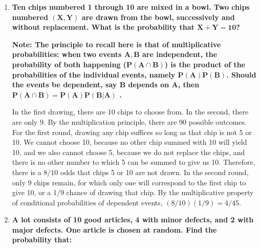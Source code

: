 \documentclass[10pt, oneside]{article}
\begin{document}
\begin{enumerate}[label=2.\arabic*]
\begin{enumerate}
	 \[ \frac{ \binom{400}{1} \binom{1100}{199} + \binom{400}{0} \binom{1100}{200}}{\binom{1500}{200}} \]
	 
	 Therefore, the probability that at least 2 defective items are found is:
	 
	  \[ \boxed{ 1 - \Bigg[ \frac{ \binom{400}{1} \binom{1100}{199} + \binom{400}{0} \binom{1100}{200}}{\binom{1500}{200}} \Bigg] } \]

	\end{enumerate}
\item \begin{tcolorbox}[
  colback=Cerulean!5!white,
  colframe=Cerulean!75!black]
  \textbf{Ten chips numbered 1 through 10 are mixed in a bowl. Two chips numbered $\bm{(X,Y)}$ are drawn from the bowl, successively and without replacement. What is the probability that $\bm{X + Y = 10}$?}
   \end{tcolorbox}
   
   \textbf{Note: The principle to recall here is that of multiplicative probabilities: when two events $\bm{A, B}$ are independent, the probability of both happening ($\bm{P(A \cap B)}$) is the product of the probabilities of the individual events, namely $\bm{P(A)P(B)}$. Should the events be dependent, say $\bm{B}$ depends on $\bm{A}$, then $\bm{P(A \cap B) = P(A) P(B | A)}$ .}
   
   In the first drawing, there are 10 chips to choose from. In the second, there are only 9. By the multiplication principle, there are 90 possible outcomes. For the first round, drawing any chip suffices so long as that chip is not 5 or 10. We cannot choose 10, because no other chip summed with 10 will yield 10, and we also cannot choose 5, because we do not replace the chips, and there is no other number to which 5 can be summed to give us 10. Therefore, there is a $8/10$ odds that chips 5 or 10 are not drawn. In the second round, only 9 chips remain, for which only one will correspond to the first chip to give 10, or a 1/9 chance of drawing that chip. By the multiplicative property of conditional probabilities of dependent events, $(8/10)(1/9) = \boxed{4/45}$.

\item \begin{tcolorbox}[
  colback=Cerulean!5!white,
  colframe=Cerulean!75!black]
  \textbf{A lot consists of 10 good articles, 4 with minor defects, and 2 with major defects. One article is chosen at random. Find the probability that:}
  \end{tcolorbox}
  

\end{enumerate}
\end{document}
